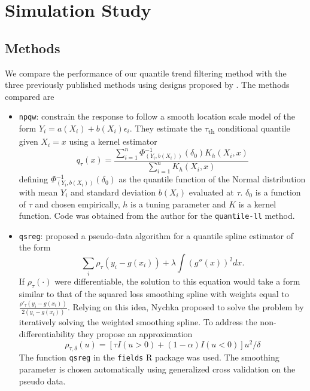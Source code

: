 \documentclass[12pt]{article}
\numberwithin{equation}{section}
\theoremstyle{plain}
\begin{document}
\section{Simulation Study}

\subsection*{Methods}
We compare the performance of our quantile trend filtering method with the three previously published methods using designs proposed by \cite{Racine2017}. The methods compared are 

\begin{itemize}
	\item \texttt{npqw}: \cite{Racine2017} constrain the response to follow a smooth location scale model of the form $Y_i = a(X_i) + b(X_i)\epsilon_i$. They estimate the $\tau$\textsubscript{th} conditional quantile given $X_i = x$ using a kernel estimator
	\begin{equation}
		q_{\tau}(x) = \frac{\sum_{i=1}^n \Phi^{-1}_{(Y_i, b(X_i))}(\delta_0)K_h(X_i,x)}{\sum_{i=1}^nK_h(X_i, x)}
	\end{equation}
	defining $\Phi^{-1}_{(Y_i, b(X_i))}(\delta_0)$ as the quantile function of the Normal distribution with mean $Y_i$ and standard deviation $b(X_i)$ evaluated at $\tau$. $\delta_0$ is a function of $\tau$ and chosen empirically, $h$ is a tuning parameter and $K$ is a kernel function. Code was obtained from the author for the \texttt{quantile-ll} method. 
	
	\item \texttt{qsreg}: \cite{Oh2011} proposed a pseudo-data algorithm for a quantile spline estimator of the form 
	\begin{equation}
	\sum_i \rho_{\tau}(y_i - g(x_i)) + \lambda\int(g''(x))^2dx.
	\end{equation} 
	If $\rho_{\tau}(\cdot)$ were differentiable, the solution to this equation would take a form similar to that of the squared loss smoothing spline with weights equal to $\frac{\rho'_{\tau}(y_i-g(x_i))}{2(y_i - g(x_i))}$. Relying on this idea, Nychka proposed to solve the problem by iteratively solving the weighted smoothing spline. To address the non-differentiability they propose an approximation 
	\begin{equation}
	\rho_{\tau, \delta}(u) = [\tau I(u>0) + (1-\alpha)I(u<0)]u^2/\delta
	\end{equation}
	The function \texttt{qsreg} in the \texttt{fields} R package was used. The smoothing parameter is chosen automatically using generalized cross validation on the pseudo data.
	

\end{itemize}
\end{document}
